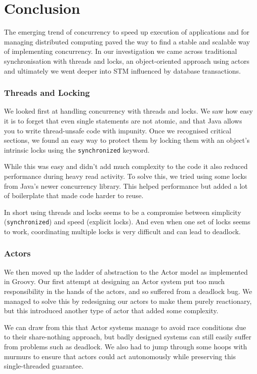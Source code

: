 \documentclass[a4paper,12pt]{kth-mag}
\begin{document}
\part{Conclusion}
The emerging trend of concurrency to speed up execution of applications and for managing distributed computing paved the way to find a stable and scalable way of implementing concurrency. In our investigation we came across traditional synchronisation with threads and locks, an object-oriented approach using actors and ultimately we went deeper into STM influenced by database transactions.

\section{Threads and Locking}

We looked first at handling concurrency with threads and locks. We saw how easy it is to forget that even single statements are not atomic, and that Java allows you to write thread-unsafe code with impunity. Once we recognised critical sections, we found an easy way to protect them by locking them with an object's intrinsic locks using the \texttt{synchronized} keyword.

While this was easy and didn't add much complexity to the code it also reduced performance during heavy read activity. To solve this, we tried using some locks from Java's newer concurrency library. This helped performance but added a lot of boilerplate that made code harder to reuse.

In short using threads and locks seems to be a compromise between simplicity (\texttt{synchronized}) and speed (explicit locks). And even when one set of locks seems to work, coordinating multiple locks is very difficult and can lead to deadlock.

\section{Actors}

We then moved up the ladder of abstraction to the Actor model as implemented in Groovy. Our first attempt at designing an Actor system put too much responsibility in the hands of the actors, and so suffered from a deadlock bug. We managed to solve this by redesigning our actors to make them purely reactionary, but this introduced another type of actor that added some complexity.

We can draw from this that Actor systems manage to avoid race conditions due to their share-nothing approach, but badly designed systems can still easily suffer from problems such as deadlock. We also had to jump through some hoops with murmurs to ensure that actors could act autonomously while preserving this single-threaded guarantee. 
\end{document}
